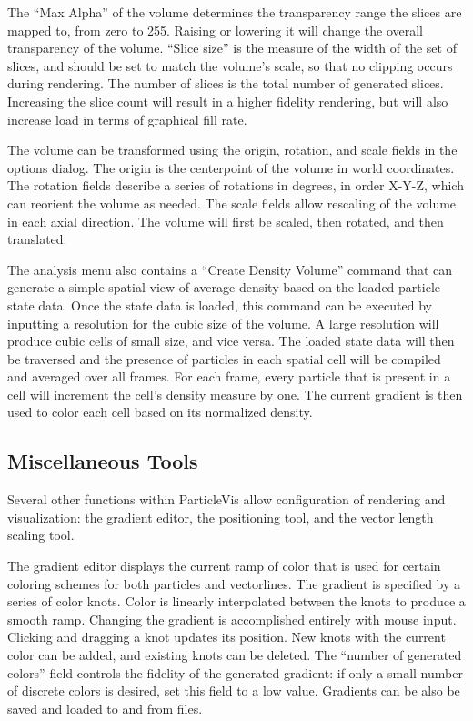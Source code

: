 The ``Max Alpha'' of the volume determines the transparency range the slices are mapped to, from zero to 255.  Raising or lowering it will change the overall transparency of the volume.  ``Slice size'' is the measure of the width of the set of slices, and should be set to match the volume's scale, so that no clipping occurs during rendering.  The number of slices is the total number of generated slices.  Increasing the slice count will result in a higher fidelity rendering, but will also increase load in terms of graphical fill rate.

The volume can be transformed using the origin, rotation, and scale fields in the options dialog.  The origin is the centerpoint of the volume in world coordinates.  The rotation fields describe a series of rotations in degrees, in order X-Y-Z, which can reorient the volume as needed.  The scale fields allow rescaling of the volume in each axial direction.  The volume will first be scaled, then rotated, and then translated.

The analysis menu also contains a ``Create Density Volume'' command that can generate a simple spatial view of average density based on the loaded particle state data.  Once the state data is loaded, this command can be executed by inputting a resolution for the cubic size of the volume.  A large resolution will produce cubic cells of small size, and vice versa.  The loaded state data will then be traversed and the presence of particles in each spatial cell will be compiled and averaged over all frames.  For each frame, every particle that is present in a cell will increment the cell's density measure by one.  The current gradient is then used to color each cell based on its normalized density.

\subsection{Miscellaneous Tools}
\label{misc-tools}

  Several other functions within ParticleVis allow configuration of rendering and visualization: the gradient editor, the positioning tool, and the vector length scaling tool.
  
  The gradient editor displays the current ramp of color that is used for certain coloring schemes for both particles and vectorlines.  The gradient is specified by a series of color knots.  Color is linearly interpolated between the knots to produce a smooth ramp.  Changing the gradient is accomplished entirely with mouse input.  Clicking and dragging a knot updates its position.  New knots with the current color can be added, and existing knots can be deleted.  The ``number of generated colors'' field controls the fidelity of the generated gradient: if only a small number of discrete colors is desired, set this field to a low value.  Gradients can be also be saved and loaded to and from files.
  
